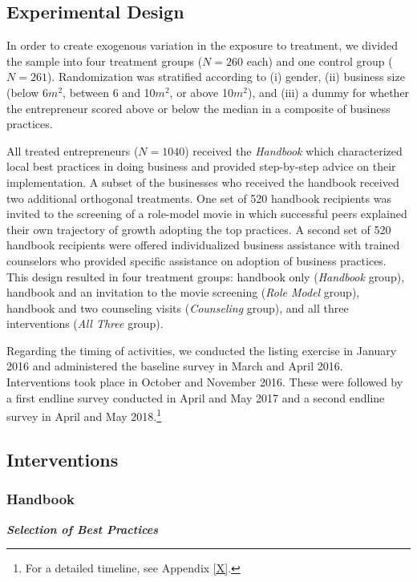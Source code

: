\documentclass[11.5pt]{article}
\begin{document}
\subsection{Experimental Design}

In order to create exogenous variation in the exposure to treatment, we divided the sample into four treatment groups ($N = 260$ each) and one control group ($N = 261$). Randomization was stratified according to (i) gender, (ii) business size (below 6$m^2$, between 6 and 10$m^2$, or above 10$m^2$), and (iii) a dummy for whether the entrepreneur scored above or below the median in a composite of business practices.

All treated entrepreneurs ($N = 1040$) received the \emph{Handbook} which characterized local best practices in doing business and provided step-by-step advice on their implementation. A subset of the businesses who received the handbook received two additional orthogonal treatments. One set of 520 handbook recipients was invited to the screening of a role-model movie in which successful peers explained their own trajectory of growth adopting the top practices. A second set of 520 handbook recipients were offered individualized business assistance with trained counselors who provided specific assistance on adoption of business practices. This design resulted in four treatment groups: handbook only (\emph{Handbook} group), handbook and an invitation to the movie screening (\emph{Role Model} group), handbook and two counseling visits (\emph{Counseling} group), and all three interventions (\emph{All Three} group).

Regarding the timing of activities, we conducted the listing exercise in January 2016 and administered the baseline survey in March and April 2016. Interventions took place in October and November 2016. These were followed by a first endline survey conducted in April and May 2017 and a second endline survey in April and May 2018.\footnote{For a detailed timeline, see Appendix \ref{X}.}

\subsection{Interventions}

\subsubsection{Handbook}

\emph{\textbf{Selection of Best Practices}}\
\end{document}
